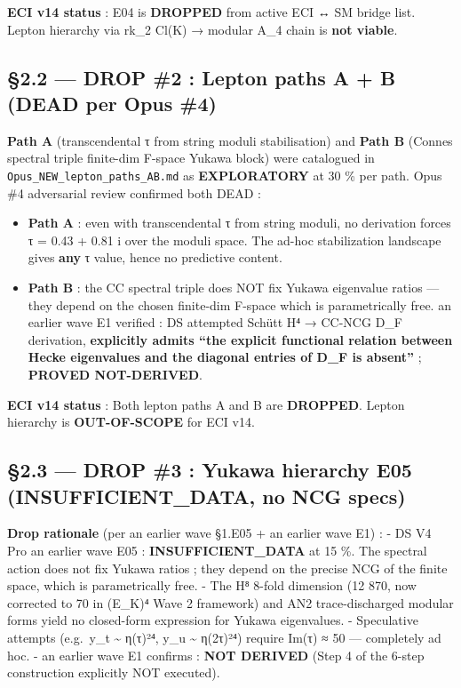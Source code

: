 \documentclass[
  11pt,
  a4paper,
]{article}
\providecommand{\tightlist}{\setlength{\itemsep}{0pt}\setlength{\parskip}{0pt}}
\providecommand{\tightlist}{%
  \setlength{\itemsep}{0pt}\setlength{\parskip}{0pt}}
\begin{document}
\textbf{ECI v14 status} : E04 is \textbf{DROPPED} from active ECI ↔ SM bridge list. Lepton hierarchy via rk\_2 Cl(K) → modular A\_4 chain is \textbf{not viable}.

\hypertarget{drop-2-lepton-paths-a-b-dead-per-opus-4}{%
\subsection{§2.2 --- DROP \#2 : Lepton paths A + B (DEAD per Opus \#4)}\label{drop-2-lepton-paths-a-b-dead-per-opus-4}}

\textbf{Path A} (transcendental τ from string moduli stabilisation) and \textbf{Path B} (Connes spectral triple finite-dim F-space Yukawa block) were catalogued in \texttt{Opus\_NEW\_lepton\_paths\_AB.md} as \textbf{EXPLORATORY} at 30 \% per path. Opus \#4 adversarial review confirmed both DEAD :

\begin{itemize}
\tightlist
\item
  \textbf{Path A} : even with transcendental τ from string moduli, no derivation forces τ = 0.43 + 0.81 i over the moduli space. The ad-hoc stabilization landscape gives \textbf{any} τ value, hence no predictive content.
\item
  \textbf{Path B} : the CC spectral triple does NOT fix Yukawa eigenvalue ratios --- they depend on the chosen finite-dim F-space which is parametrically free. an earlier wave E1 verified : DS attempted Schütt H⁴ → CC-NCG D\_F derivation, \textbf{explicitly admits ``the explicit functional relation between Hecke eigenvalues and the diagonal entries of D\_F is absent''} ; \textbf{PROVED NOT-DERIVED}.
\end{itemize}

\textbf{ECI v14 status} : Both lepton paths A and B are \textbf{DROPPED}. Lepton hierarchy is \textbf{OUT-OF-SCOPE} for ECI v14.

\hypertarget{drop-3-yukawa-hierarchy-e05-insufficient_data-no-ncg-specs}{%
\subsection{§2.3 --- DROP \#3 : Yukawa hierarchy E05 (INSUFFICIENT\_DATA, no NCG specs)}\label{drop-3-yukawa-hierarchy-e05-insufficient_data-no-ncg-specs}}

\textbf{Drop rationale} (per an earlier wave §1.E05 + an earlier wave E1) :
- DS V4 Pro an earlier wave E05 : \textbf{INSUFFICIENT\_DATA} at 15 \%. The spectral action does not fix Yukawa ratios ; they depend on the precise NCG of the finite space, which is parametrically free.
- The H⁸ 8-fold dimension (12 870, now corrected to 70 in (E\_K)⁴ Wave 2 framework) and AN2 trace-discharged modular forms yield no closed-form expression for Yukawa eigenvalues.
- Speculative attempts (e.g.~y\_t \textasciitilde{} η(τ)²⁴, y\_u \textasciitilde{} η(2τ)²⁴) require Im(τ) ≈ 50 --- completely ad hoc.
- an earlier wave E1 confirms : \textbf{NOT DERIVED} (Step 4 of the 6-step construction explicitly NOT executed).
\end{document}
